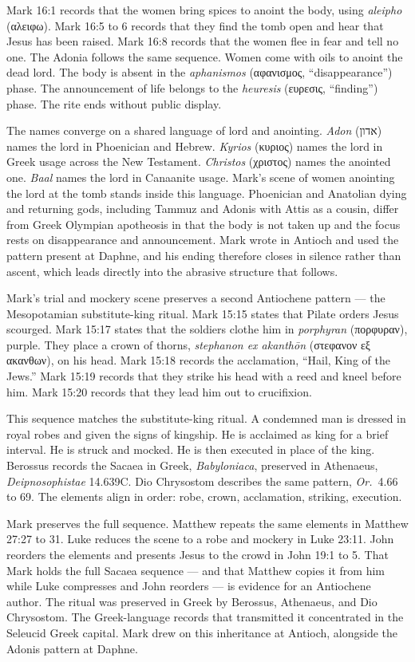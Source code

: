 Mark 16:1 records that the women bring spices to anoint the body, using \emph{aleipho} (αλειφω).
Mark 16:5 to 6 records that they find the tomb open and hear that Jesus has been raised.
Mark 16:8 records that the women flee in fear and tell no one.
The Adonia follows the same sequence.
Women come with oils to anoint the dead lord.
The body is absent in the \emph{aphanismos} (αφανισμος, ``disappearance'') phase.
The announcement of life belongs to the \emph{heuresis} (ευρεσις, ``finding'') phase.
The rite ends without public display.

The names converge on a shared language of lord and anointing.
\emph{Adon} (אדון) names the lord in Phoenician and Hebrew.
\emph{Kyrios} (κυριος) names the lord in Greek usage across the New Testament.
\emph{Christos} (χριστος) names the anointed one.
\emph{Baal} names the lord in Canaanite usage.
Mark's scene of women anointing the lord at the tomb stands inside this language.
Phoenician and Anatolian dying and returning gods, including Tammuz and Adonis with Attis as a cousin, differ from Greek Olympian apotheosis in that the body is not taken up and the focus rests on disappearance and announcement.
Mark wrote in Antioch and used the pattern present at Daphne, and his ending therefore closes in silence rather than ascent, which leads directly into the abrasive structure that follows.

Mark's trial and mockery scene preserves a second Antiochene pattern --- the Mesopotamian substitute-king ritual.
Mark 15:15 states that Pilate orders Jesus scourged.
Mark 15:17 states that the soldiers clothe him in \emph{porphyran} (πορφυραν), purple.
They place a crown of thorns, \emph{stephanon ex akanth\=on} (στεφανον εξ ακανθων), on his head.
Mark 15:18 records the acclamation, ``Hail, King of the Jews.''
Mark 15:19 records that they strike his head with a reed and kneel before him.
Mark 15:20 records that they lead him out to crucifixion.

This sequence matches the substitute-king ritual.
A condemned man is dressed in royal robes and given the signs of kingship.
He is acclaimed as king for a brief interval.
He is struck and mocked.
He is then executed in place of the king.
Berossus records the Sacaea in Greek, \emph{Babyloniaca}, preserved in Athenaeus, \emph{Deipnosophistae} 14.639C.
Dio Chrysostom describes the same pattern, \emph{Or.}\ 4.66 to 69.
The elements align in order: robe, crown, acclamation, striking, execution.

Mark preserves the full sequence.
Matthew repeats the same elements in Matthew 27:27 to 31.
Luke reduces the scene to a robe and mockery in Luke 23:11.
John reorders the elements and presents Jesus to the crowd in John 19:1 to 5.
That Mark holds the full Sacaea sequence --- and that Matthew copies it from him while Luke compresses and John reorders --- is evidence for an Antiochene author.
The ritual was preserved in Greek by Berossus, Athenaeus, and Dio Chrysostom.
The Greek-language records that transmitted it concentrated in the Seleucid Greek capital.
Mark drew on this inheritance at Antioch, alongside the Adonis pattern at Daphne.

